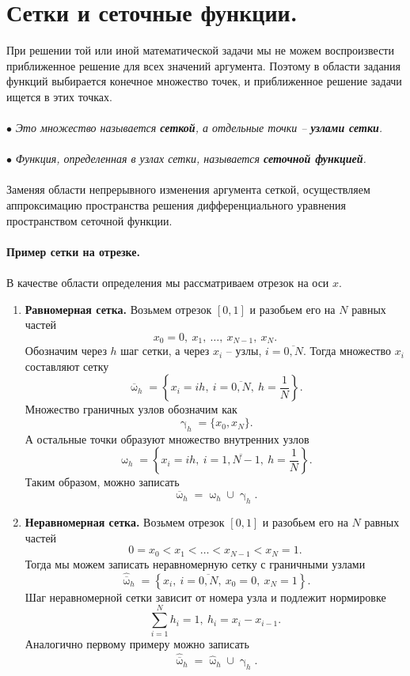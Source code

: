 \documentclass[a4paper, 12pt]{report}
\numberwithin{equation}{section}
\renewcommand{\gamma}{\upgamma}
\renewcommand{\omega}{\upomega}
\begin{document}
	\section{Сетки и сеточные функции.}
	При решении той или иной математической задачи мы не можем воспроизвести приближенное решение для всех значений аргумента. Поэтому в области задания функций выбирается конечное множество точек, и приближенное решение задачи ищется в этих точках.
	\\\\
	$\bullet$ \textit{Это множество называется \textbf{сеткой}, а отдельные точки -- \textbf{узлами сетки}.}
	\\\\
	$\bullet$ \textit{Функция, определенная в узлах сетки, называется \textbf{сеточной функцией}.}
	\\\\
	Заменяя области непрерывного изменения аргумента сеткой, осуществляем аппроксимацию пространства решения дифференциального уравнения пространством сеточной функции.
	\\\\
	\textbf{Пример сетки на отрезке.}\\\\
	В качестве области определения мы рассматриваем отрезок на оси $x$.
	\begin{enumerate}
		\item \textbf{Равномерная сетка.}
		Возьмем отрезок $[0,1]$ и разобьем его на $N$ равных частей $$x_0=0,\ x_1,\ \ldots,\ x_{N-1},\ x_N.$$
		Обозначим через $h$ шаг сетки, а через $x_i$ -- узлы, $i=\overline{0,N}$. Тогда множество $x_i$ составляют сетку 
		$$\overline \omega _ h = \left\{x_i = ih,\ i=\overline{0, N},\ h = \dfrac1N\right\}.$$
		Множество граничных узлов обозначим как $$\gamma_h = \{x_0, x_N\}.$$
		А остальные точки образуют множество внутренних узлов
		$$ \omega _ h = \left\{x_i = ih,\ i=\overline{1, N-1},\ h = \dfrac1N\right\}.$$
		Таким образом, можно записать 
		$$\overline \omega _h = \omega _h \cup \gamma _h.$$
		\item \textbf{Неравномерная сетка.}
		Возьмем отрезок $[0,1]$ и разобьем его на $N$ равных частей $$0=x_0 < x_1 <\ldots< x_{N-1} < x_N=1.$$
		Тогда мы можем записать неравномерную сетку с граничными узлами 
		$$\hat {\overline \omega} _ h = \left\{x_i,\ i=\overline{0, N},\ x_0 = 0, \ x_N=1\right\}.$$
		Шаг неравномерной сетки зависит от номера узла и подлежит нормировке $$\sum_{i=1}^{N} h_i=1,\ h_i=x_i - x_{i-1}.$$
		Аналогично первому примеру можно записать $$\hat {\overline \omega} _ h = \hat \omega_h \cup \hat\gamma _h.$$
	\end{enumerate}
	
\end{document}
